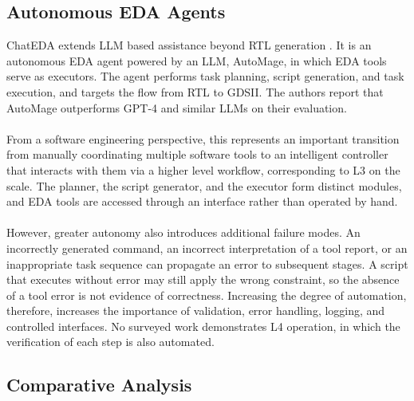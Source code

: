 \documentclass[conference]{IEEEtran}
\begin{document}
\subsection{Autonomous EDA Agents}\label{L5}

\noindent ChatEDA extends LLM based assistance beyond RTL generation \cite{P5_Wu2024}. It is an autonomous EDA agent powered by an LLM, AutoMage, in which EDA tools serve as executors. The agent performs task planning, script generation, and task execution, and targets the flow from RTL to GDSII. The authors report that AutoMage outperforms GPT-4 and similar LLMs on their evaluation.
\\\\
\noindent From a software engineering perspective, this represents an important transition from manually coordinating multiple software tools to an intelligent controller that interacts with them via a higher level workflow, corresponding to L3 on the scale. The planner, the script generator, and the executor form distinct modules, and EDA tools are accessed through an interface rather than operated by hand.
\\\\
\noindent However, greater autonomy also introduces additional failure modes. An incorrectly generated command, an incorrect interpretation of a tool report, or an inappropriate task sequence can propagate an error to subsequent stages. A script that executes without error may still apply the wrong constraint, so the absence of a tool error is not evidence of correctness. Increasing the degree of automation, therefore, increases the importance of validation, error handling, logging, and controlled interfaces. No surveyed work demonstrates L4 operation, in which the verification of each step is also automated.

\subsection{Comparative Analysis}\label{sec_compare}
\end{document}
